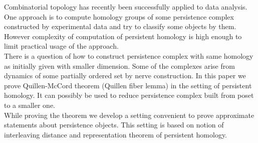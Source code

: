 Combinatorial topology has recently been successfully applied to data analysis. One approach is to compute homology groups of some persistence complex constructed by experimental data and try to classify some objects by them. However complexity of computation of persistent homology is high enough to limit practical usage of the approach.\\

There is a question of how to construct persistence complex with same homology as initially given with smaller dimension. Some of the complexes arise from dynamics of some partially ordered set by nerve construction. In this paper we prove Quillen-McCord theorem (Quillen fiber lemma) in the setting of persistent homology. It can possibly be used to reduce persistence complex built from poset to a smaller one.\\

While proving the theorem we develop a setting convenient to prove approximate statements about persistence objects. This setting is based on notion of interleaving distance and representation theorem of persistent homology.
